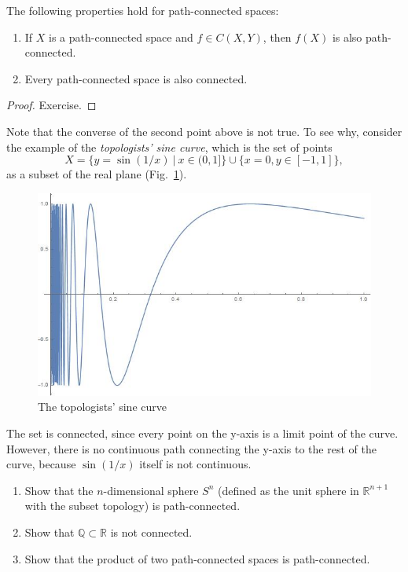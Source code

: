 \documentclass[english,letterpaper]{article}%
\numberwithin{equation}{section}
\numberwithin{figure}{section}
\numberwithin{table}{section}
\theoremstyle{definition}
\theoremstyle{definition}
\theoremstyle{definition}
\theoremstyle{plain}
\theoremstyle{plain}
\theoremstyle{plain}
\theoremstyle{plain}
\theoremstyle{remark}
\theoremstyle{remark}
\begin{document}
\begin{prop} The following properties hold for path-connected spaces:
\begin{enumerate}
    \item If $X$ is a path-connected space and $f\in C(X,Y)$, then $f(X)$ is also path-connected.
    \item Every path-connected space is also connected.
\end{enumerate}
\end{prop}
\begin{proof}
Exercise.
\end{proof}

Note that the converse of the second point above is not true. To see why, consider the example of the \emph{topologists' sine curve}, which is the set of points
\begin{equation}
X = \{y = \sin(1/x) ~|~ x\in(0,1]\} \cup \{ x=0, y\in[-1,1] \},
\end{equation}
as a subset of the real plane (Fig.\ \ref{tsine}).
\begin{figure}[ht]
    \centering
    \includegraphics[scale=0.3]{Images/Top_sin.jpg}
    \caption{The topologists' sine curve}
    \label{tsine}
\end{figure}
The set is connected, since every point on the y-axis is a limit point of the curve. However, there is no continuous path connecting the y-axis to the rest of the curve, because $\sin(1/x)$ itself is not continuous.

\begin{xca}
\begin{enumerate}
    \item Show that the $n$-dimensional sphere $S^n$ (defined as the unit sphere in $\mathbb{R}^{n+1}$ with the subset topology) is path-connected.
    \item Show that $\mathbb{Q}\subset\mathbb{R}$ is not connected.
    \item Show that the product of two path-connected spaces is path-connected.
\end{enumerate}
\end{xca}
\end{document}
